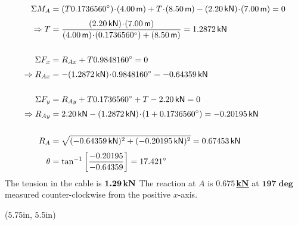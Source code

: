 \documentclass[10pt,oneside]{article}
\begin{document}
\begin{textblock*}{3.5in}
  \begin{align*}
    \Sigma M_A &= (T\sin 60\deg)\cd(4.00\,\mathsf{m})+T\cd(8.50\,\mathsf{m})-(2.20\,\mathsf{kN})\cd(7.00\,\mathsf{m}) = 0 \\[0.25em]
    \Ra T &= \frac{(2.20\,\mathsf{kN})\cd(7.00\,\mathsf{m})}{(4.00\,\mathsf{m})\cd(\sin 60\deg)+(8.50\,\mathsf{m})} = 1.2872\,\mathsf{kN} \\\\
    \Sigma F_x &= R_{Ax}+T\cos 60\deg = 0 \\[0.25em]
    \Ra R_{Ax} &= -(1.2872\,\mathsf{kN})\cd\cos 60\deg = -0.64359\,\mathsf{kN} \\\\
    \Sigma F_y &= R_{Ay} +T\sin 60\deg +T - 2.20\,\mathsf{kN} = 0 \\[0.25em]
    \Ra R_{Ay} &= 2.20\,\mathsf{kN} -(1.2872\,\mathsf{kN})\cd(1+\sin 60\deg) = -0.20195\,\mathsf{kN} \\\\
    R_A &= \sqrt{(-0.64359\,\mathsf{kN})^2+(-0.20195\,\mathsf{kN})^2} = 0.67453\,\mathsf{kN}\\[0.25em]
    \theta &= \tan^{-1}\left[\frac{-0.20195}{-0.64359}\right] = 17.421\deg
  \end{align*}
  \large\centering\parb
  The tension in the cable is \underline{$\bm{1.29}\,\mathsf{\bf kN}$} \parb
  The reaction at $A$ is \underline{$\bm{0.675\,}${\bf kN}} at \underline{$\bm{197\deg}$} measured counter-clockwise from the positive $x$-axis.

\end{textblock*}
\begin{textblock*}{0.25\textwidth}(5.75in, 5.5in)
\end{textblock*}



\end{document}
